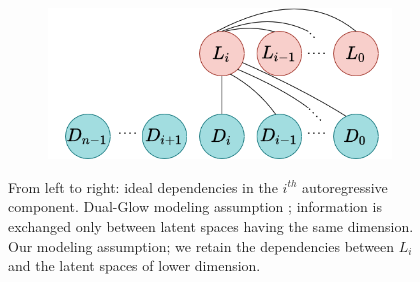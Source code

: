 \begin{figure}[h]
\begin{subfigure}{0.31\textwidth}
        \includegraphics[width=\textwidth]{Outline/figures/caflow/oursdependencies.png}
        \end{subfigure}
    \caption{From left to right: ideal dependencies in the $i^{th}$ autoregressive component. Dual-Glow modeling assumption \cite{Dual-Glow}; information is exchanged only between latent spaces having the same dimension. Our modeling assumption; we retain the dependencies between $L_i$ and the latent spaces of lower dimension.}	\label{fig:dependencies}
    \end{figure}

